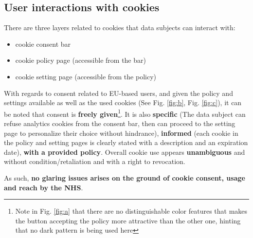 \documentclass[twocolumn, letterpaper,13pt]{scrartcl}
\begin{document}
	\subsection*{User interactions with cookies}
	
	There are three layers related to cookies that data subjects can interact with:
	
	\begin{itemize}
	    \item cookie consent bar
	    \item cookie policy page (accessible from the bar)
	    \item cookie setting page (accessible from the policy)
	\end{itemize}
	
	With regards to consent related to EU-based users, and given the policy\cite{cookiepolicy} and settings\cite{cookiesettings} available as well as the used cookies (See Fig. \ref{fig:b}, Fig. \ref{fig:c}), it can be noted that consent is \textbf{freely given}\footnote{Note in Fig. \ref{fig:a} that there are no distinguishable color features that makes the button accepting the policy more attractive than the other one, hinting that no dark pattern is being used here}. It is also \textbf{specific} (The data subject can refuse analytics cookies from the consent bar, then can proceed to the setting page to personalize their choice without hindrance), \textbf{informed} (each cookie in the policy and setting pages is clearly stated with a description and an expiration date), \textbf{with a provided policy}. Overall cookie use appears \textbf{unambiguous} and without condition/retaliation and with a right to revocation.
	
	As such, \textbf{no glaring issues arises on the ground of cookie consent, usage and reach by the NHS}.
\end{document}
